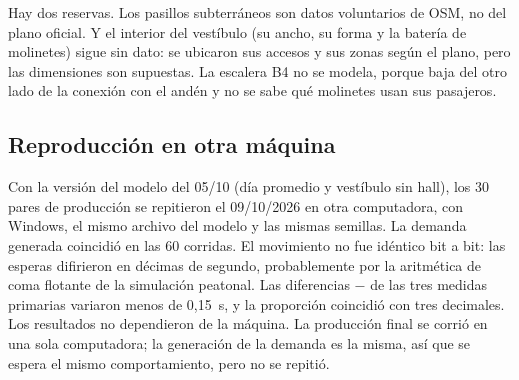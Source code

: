Hay dos reservas. Los pasillos subterráneos son datos voluntarios de OSM, no del plano oficial. Y el
interior del vestíbulo (su ancho, su forma y la batería de molinetes) sigue sin dato: se ubicaron sus
accesos y sus zonas según el plano, pero las dimensiones son supuestas. La escalera B4 no se modela, porque
baja del otro lado de la conexión con el andén y no se sabe qué molinetes usan sus pasajeros.

\subsection{Reproducción en otra máquina}
\label{anx:reproduccion}

Con la versión del modelo del 05/10 (día promedio y vestíbulo sin hall), los 30 pares de producción se
repitieron el 09/10/2026 en otra computadora, con Windows, el mismo archivo
del modelo y las mismas semillas. La demanda generada coincidió en las 60 corridas. El movimiento no fue
idéntico bit a bit: las esperas difirieron en décimas de segundo, probablemente por la aritmética de coma
flotante de la simulación peatonal. Las diferencias \EI{} $-$ \EO{} de las tres medidas primarias variaron
menos de 0,15~s, y la proporción coincidió con tres decimales. Los resultados no dependieron de la máquina. La
producción final se corrió en una sola computadora; la generación de la demanda es la misma, así que se espera
el mismo comportamiento, pero no se repitió.
